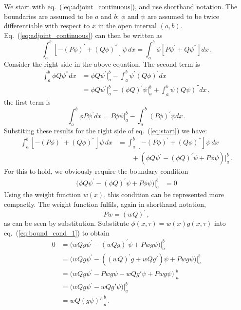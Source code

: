 \documentclass[preprint]{elsarticle}
\begin{document}
{We start with eq.~(\ref{eq:adjoint_continuous}), and use shorthand notation. The boundaries are assumed to be $a$ and $b$; $\phi$ and $\psi$ are assumed to be twice differentiable with respect to $x$ in the open interval $(a,b)$. Eq.~(\ref{eq:adjoint_continuous}) can then be written as
\begin{equation}\label{eq:start}
\int_a^b  \left[-(P\phi)^{'}+(Q\phi)^{''}\right] \psi\, dx=
\int_a^b  \phi \left[P\psi^{'}+Q\psi^{''}\right] dx\,.
\end{equation}
Consider the right side in the above equation. The second term is
\begin{equation}
\begin{split}
\int_a^b  \phi Q\psi^{''} dx&=
\phi Q\psi^{'}\big|_a^b-\int_a^b  \psi^{'}(Q\phi)^{'} dx\\
&=\phi Q\psi^{'}\big|_a^b-(\phi Q)^{'}\psi\big|_a^b+\int_a^b  \psi(Q\psi)^{''} dx\,,
\end{split}
\end{equation}
the first term is 
\begin{equation}
\int_a^b  \phi P\psi^{'} dx= P\phi\psi\big|_a^b -\int_a^b  (P\phi)^{'}\psi dx\,.
\end{equation}
Substiting these results for the right side of eq.~(\ref{eq:start}) we have:
\begin{equation}\label{eq:adjoint_shorthand}
\begin{split}
\int_a^b  \left[-(P\phi)^{'}+(Q\phi)^{''}\right] \psi\, dx&=
\int_a^b  \left[-(P\phi)^{'}+(Q\phi)^{''}\right]\psi\,dx\\
&\qquad+(\phi Q\psi^{'}-(\phi Q)^{'}\psi+P\phi\psi)\big|_a^b\,.
\end{split}
\end{equation}
For this to hold, we obviously require the boundary condition
\begin{equation}\label{eq:bound_cond_1}
\begin{split}
\big(\phi Q\psi^{'}-(\phi Q)^{'}\psi+P\phi\psi\big)\big|_a^b&=0
\end{split}
\end{equation}
Using the weight function $w(x)$, this condition can be represented more compactly. The weight function fulfils, again in shorthand notation, 
\begin{equation}
Pw=(wQ)^{'}\,,
\end{equation}
as can be seen by substitution. Substitute $\phi(x,\tau)=w(x)g(x,\tau)$ into eq.~(\ref{eq:bound_cond_1}) to obtain
\begin{equation}\label{eq:bound_cond_2}
\begin{split}
0&=\big(w Q g\psi^{'}-(w Q g)^{'}\psi+P w g\psi\big)\big|_a^b\\
&=\big(w Q g\psi^{'}-((w Q)^{'}g+w Q g')\psi+P w g\psi\big)\big|_a^b\\
&=\big(w Q g\psi^{'}-Pwg\psi-w Q g'\psi+P w g\psi\big)\big|_a^b\\
&=\big(w Q g\psi^{'}-w Qg'\psi\big)\big|_a^b\\
&=w Q(g\psi)'\big|_a^b\,.
\end{split}
\end{equation}

}
\end{document}
